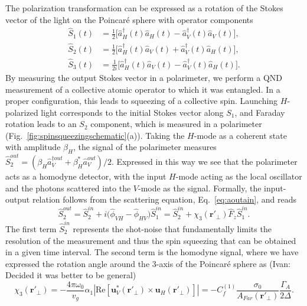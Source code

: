 \documentclass[preprint,aps,pra,onecolumn,superscriptaddress]{revtex4-1} %
\newcommand{\mbf}[1]{\mathbf{#1}}
\newcommand{\smallfrac}[2]{\mbox{$\frac{#1}{#2}$}}
\newcommand{\Poincare}{Poincar\'e\xspace}
\begin{document}
The polarization transformation can be expressed as a rotation of the Stokes vector of the light on the \Poincare sphere with operator components
\begin{subequations}\label{Eq::StokesComponents}
	\begin{align}
		\hat{S}_1(t) & = \smallfrac{1}{2}\big[ \hat{a}^\dag_H(t) \hat{a}_H(t)-\hat{a}^\dag_V(t) \hat{a}_V(t) \big], \\
	 	\hat{S}_2(t) & = \smallfrac{1}{2}\big[ \hat{a}^\dag_H(t) \hat{a}_V(t)+\hat{a}^\dag_V(t) \hat{a}_H(t) \big], \\ 
		\hat{S}_3(t) & = \smallfrac{1}{2i}\big[ \hat{a}^\dag_H(t) \hat{a}_V(t) -\hat{a}^\dag_V(t) \hat{a}_H(t) \big].
	\end{align}
\end{subequations}
By measuring the output Stokes vector in a polarimeter, we perform a QND measurement of a collective atomic operator to which it was entangled.  In a proper configuration, this leads to squeezing of a collective spin.  Launching $H$-polarized light corresponds to the initial Stokes vector along $S_1$, and Faraday rotation leads to an $S_2$ component, which is measured in a polarimeter (Fig.~\ref{fig:spinsqueezingschematic}(a)).  Taking the $H$-mode as a coherent state with amplitude $\beta_H$, the signal of the polarimeter measures $\hat{S}_2^{out} = (\beta_H \hat{a}_V^{\dag out} +\beta^*_H \hat{a}_V^{out})/2$.  Expressed in this way we see that the polarimeter acts as a homodyne detector, with the input $H$-mode acting as the local oscillator and the photons scattered into the $V$-mode as the signal.  Formally, the input-output relation follows from the scattering equation, Eq.~\eqref{eq:aoutain}, and reads
\begin{equation}
\hat{S}^{out}_2 = \hat{S}^{in}_2 +i \big( \hat{\phi}_{VH}- \hat{\phi}_{HV} \big) \hat{S}^{in}_1 =  \hat{S}^{in}_2 + \chi_3(\mbf{r}'_\perp) \hat{F}_z \hat{S}^{in}_1.
\end{equation}
The first term $\hat{S}^{in}_2$ represents the shot-noise that fundamentally limits the resolution of the measurement and thus the spin squeezing that can be obtained in a given time interval.  The second term is the homodyne signal, where we have expressed the rotation angle around the 3-axis of the \Poincare sphere as {\color{red}(Ivan:  Decided it was better to be general)}
\begin{equation}
\chi_3(\mbf{r}'_\perp) = -\frac{4 \pi \omega_0}{v_g} \alpha_1 \left\vert \text{Re} \left[ \mbf{u}^*_V (\mbf{r}'_\perp) \times \mbf{u}_H (\mbf{r}'_\perp) \right] \right\vert =-C^{(1)}_f  \frac{\sigma_0}{A_{Far}(\mbf{r}'_\perp)} \frac{\Gamma_A}{2 \Delta}.
\end{equation}
\end{document}
